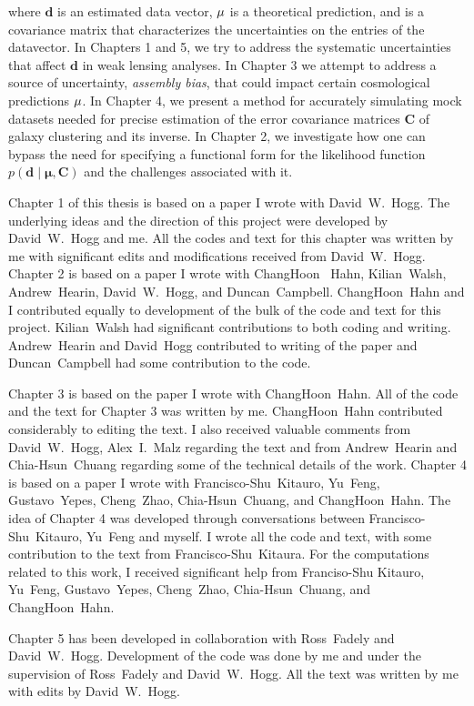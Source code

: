 where $\mathbf{d}$ is an estimated data vector, $\bf{\mu}$ is a theoretical prediction, and  is a covariance matrix that characterizes the uncertainties on the entries of the datavector. In Chapters 1 and 5, we try to address the systematic uncertainties that affect $\mathbf{d}$ in weak lensing analyses. In Chapter 3 we attempt to address a source of uncertainty, \emph{assembly bias}, that could impact certain cosmological predictions $\bf{\mu}$. In Chapter 4, we present a method for accurately simulating mock datasets needed for precise estimation of the error covariance matrices $\mathbf{C}$ of galaxy clustering and its inverse. In Chapter 2, we investigate how one can bypass the need for specifying a functional form for the likelihood function $p(\mathbf{d} \; | \; \mathbf{\mu} , \mathbf{C})$ and the challenges associated with it.

Chapter 1 of this thesis is based on a paper I wrote with David~W.~Hogg. The underlying ideas and the direction of this project were developed by David~W.~Hogg and me. 
All the codes and text for this chapter was written by me with significant edits and modifications received from David~W.~Hogg. Chapter 2 is based on a paper I wrote with ChangHoon~ Hahn, Kilian~Walsh, Andrew~Hearin, David~W.~Hogg, and Duncan~Campbell. ChangHoon~Hahn and I contributed equally to development of the bulk of the code and text for this project. Kilian~Walsh had significant contributions to both coding and writing. Andrew~Hearin and David~Hogg contributed to writing of the paper and Duncan~Campbell had some contribution 
to the code. 

Chapter 3 is based on the paper I wrote with ChangHoon~Hahn. All of the code and the text for Chapter 3 was written by me. ChangHoon~Hahn contributed considerably to editing the text. I also received valuable comments from David~W.~Hogg, Alex~I.~Malz regarding the text and from Andrew~Hearin and Chia-Hsun~Chuang regarding some of the technical details of the work. Chapter 4 is based on a paper I wrote with Francisco-Shu~Kitauro, Yu~Feng, Gustavo~Yepes, Cheng~Zhao, Chia-Hsun~Chuang, and ChangHoon~Hahn. 
The idea of Chapter 4 was developed through conversations between Francisco-Shu~Kitauro, Yu~Feng and myself. I wrote all the code and text, with some contribution to the text from Francisco-Shu~Kitaura. For the computations related to this work, I received significant help from Franciso-Shu Kitauro, Yu~Feng, Gustavo~Yepes, Cheng~Zhao, Chia-Hsun~Chuang, and ChangHoon~Hahn. 

Chapter 5 has been developed in collaboration with Ross~Fadely and David~W.~Hogg. Development of the code was done by me and under the supervision of Ross~Fadely and David~W.~Hogg. All the text was written by me with edits by David~W.~Hogg.

